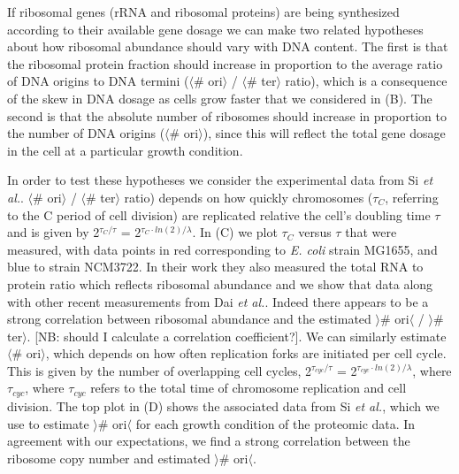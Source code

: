 If ribosomal genes (rRNA and ribosomal proteins) are being synthesized according
to their available gene dosage we can make two related hypotheses about how
ribosomal abundance should vary with DNA content. The first is that the
ribosomal protein fraction should increase in proportion  to the average ratio of
DNA origins to DNA termini ($\langle$# ori$\rangle$ / $\langle$# ter$\rangle$
ratio), which is a consequence of the skew in DNA dosage as cells grow faster
that we considered in (B). The second is that the
absolute number of ribosomes should increase in proportion to the number of DNA
origins ($\langle$# ori$\rangle$), since this will reflect the total gene dosage
in the cell at a particular growth condition.

In order to test these hypotheses we consider the experimental data from Si
\textit{et al.}. $\langle$# ori$\rangle$ / $\langle$# ter$\rangle$ ratio)
depends on how quickly chromosomes ($\tau_C$, referring to the C period of cell
division) are replicated relative the  cell's doubling time $\tau$ and is given
by 2$^{\tau_C / \tau}$ = 2$^{\tau_C \cdot ln(2)/ \lambda}$.  In
(C)  we plot $\tau_C$ versus $\tau$ that were measured,
with data points in red corresponding to \textit{E. coli} strain MG1655, and
blue  to strain NCM3722. In their work they also measured the total RNA to
protein ratio  which reflects ribosomal abundance and we show that data along
with other recent  measurements from Dai \textit{et al.}. Indeed there appears
to be a strong correlation between ribosomal abundance and the estimated
$\rangle$# ori$\langle$ / $\rangle$# ter$\rangle$. [NB: should I calculate a
correlation coefficient?]. We can similarly estimate $\langle$# ori$\rangle$,
which depends on how often replication forks are initiated per cell cycle. This
is given by the number of overlapping cell cycles,  2$^{\tau_{cyc} / \tau}$ =
2$^{\tau_{cyc} \cdot ln(2)/ \lambda}$, where $\tau_{cyc}$, where $\tau_{cyc}$
refers to the total time of chromosome replication and cell division. The top
plot in (D) shows the associated data from Si \textit{et
al.}, which we use to estimate $\rangle$# ori$\langle$  for each growth
condition of the proteomic data. In agreement with our expectations, we find a
strong correlation between the ribosome copy number and estimated $\rangle$#
ori$\langle$.


